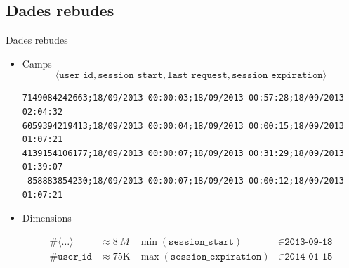 \documentclass[xcolor=x11names,
								compress,
								aspectratio=1610]{beamer}
\newcommand{\mt}[1]{\texttt{#1}}
\theoremstyle{definition}%
\renewcommand{\(}{\begin{columns}}
\renewcommand{\)}{\end{columns}}
\newcommand{\<}[1]{\begin{column}{#1}}
\renewcommand{\>}{\end{column}}
\begin{document}
	\subsection{Dades rebudes}
	\begin{frame}[fragile]{Dades rebudes}
	
		\begin{itemize}
		\item Camps
		$$
			\langle \mt{user\_id}, \mt{session\_start}, \mt{last\_request}, \mt{session\_expiration} \rangle
		$$
\begin{verbatim}
7149084242663;18/09/2013 00:00:03;18/09/2013 00:57:28;18/09/2013 02:04:32
6059394219413;18/09/2013 00:00:04;18/09/2013 00:00:15;18/09/2013 01:07:21
4139154106177;18/09/2013 00:00:07;18/09/2013 00:31:29;18/09/2013 01:39:07
 858883854230;18/09/2013 00:00:07;18/09/2013 00:00:12;18/09/2013 01:07:21
\end{verbatim}

	\item Dimensions
	
	\begin{align*}
	\#\langle \ldots \rangle & \approx \SI{8}{M}  
	& 
	\min(\texttt{session\_start}) & \in \texttt{2013-09-18} \\
	\# \mt{user\_id} & \approx 75\text{K} 
	&  
	\max(\texttt{session\_expiration}) & \in \texttt{2014-01-15} 
	\end{align*}

\end{itemize}

\end{frame}
	
\end{document}

